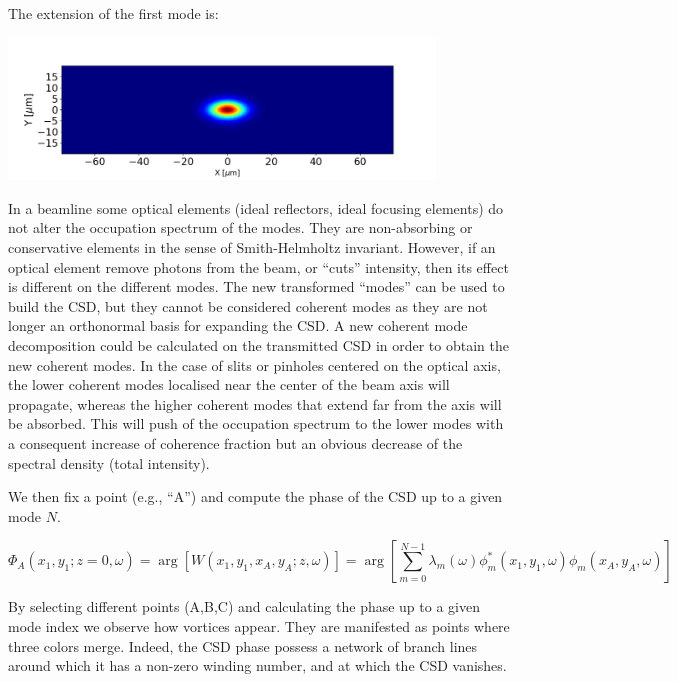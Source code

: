 \documentclass[a4paper,10pt]{article}
\begin{document}
The extension of the first mode is:

\includegraphics[width=0.85\textwidth]{Figures/spectral_density_upto0.png}

In a beamline some optical elements (ideal reflectors, ideal focusing elements) do not alter the occupation spectrum of the modes. They are non-absorbing or conservative elements in the sense of Smith-Helmholtz invariant. However, if an optical element remove photons from the beam, or ``cuts'' intensity, then its effect is different on the different modes. The new transformed ``modes'' can be used to build the CSD, but they cannot be considered coherent modes as they are not longer an orthonormal basis for expanding the CSD. A new coherent mode decomposition could be calculated on the transmitted CSD in order to obtain the new coherent modes. In the case of slits or pinholes centered on the optical axis, the lower coherent modes localised near the center of the beam axis will propagate, whereas the higher coherent modes that extend far from the axis will be absorbed. This will push of the occupation spectrum to the lower modes with a consequent increase of coherence fraction but an obvious decrease of the spectral density (total intensity).     





We then fix a point (e.g., ``A'') and compute the phase of the CSD up to a given mode $N$. 

\begin{equation}\label{phase_of_W}
\Phi_A(x_1,y_1;z=0,\omega)=\arg[W(x_1,y_1,x_A,y_A;z,\omega)]=\arg[
\sum_{m=0}^{N-1} \lambda_m(\omega)
\phi_m^*(x_1,y_1,\omega)
\phi_m(x_A,y_A, \omega)]
\end{equation}

By selecting different points (A,B,C) and calculating the phase up to a given mode index we observe how vortices appear. They are manifested as points where three colors merge.  Indeed, the CSD phase possess a network of branch lines around which it has a non-zero winding number, and at which the CSD vanishes.
\end{document}
